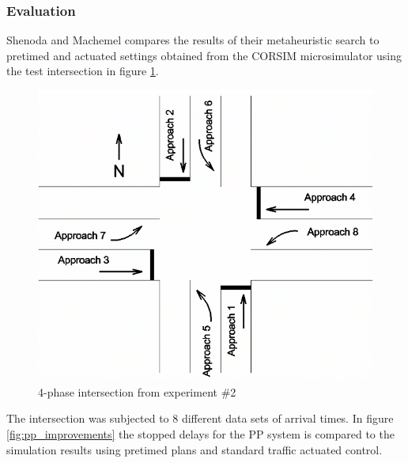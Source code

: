 \subsubsection*{Evaluation}
Shenoda and Machemel compares the results of their metaheuristic search to pretimed and actuated settings obtained from the CORSIM microsimulator using the test intersection in figure \ref{fig:pp_intersection}.

\begin{figure}[!ht]
\begin{center}
\includegraphics[scale=0.5]{phase-by-phase_testing-intersection.png} 
\end{center}
\caption{4-phase intersection from experiment \#2}
\label{fig:pp_intersection}
\end{figure}

The intersection was subjected to 8 different data sets of arrival times. In figure \ref{fig:pp_improvements} the stopped delays for the PP system is compared to the simulation results using pretimed plans and standard traffic actuated control.

